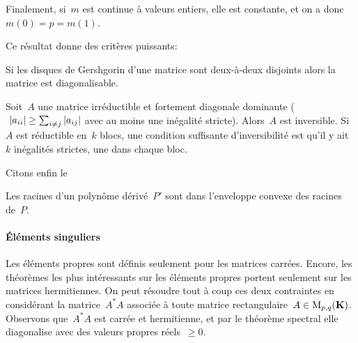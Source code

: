 \begin{exercice}
\begin{enumerate}
{		Finalement, si~$m$ est continue à valeurs entiers, elle est constante, et
		on a donc~$m(0)=p=m(1)$.
	}
\end{enumerate}
\end{exercice}

Ce résultat donne des critères puissants:

\begin{corollary}
	Si les disques de Gershgorin d'une matrice sont deux-à-deux disjoints alors
	la matrice est diagonalisable.
\end{corollary}

\begin{proposition}
	Soit~$A$ une matrice irréductible et fortement diagonale dominante
	($\ \left|a_{ii}\right|\ge\sum_{i\neq j}\left|a_{ij}\right|$ avec au moins une inégalité
	stricte).  Alors~$A$ est inversible.  Si~$A$ est réductible en~$k$ blocs,
	une condition suffisante d'inversibilité est qu'il y ait~$k$ inégalités
	strictes, une dans chaque bloc.
\end{proposition}

Citons enfin le
\begin{exercice}
	Les racines d'un polynôme dérivé~$P'$ sont dans l'enveloppe convexe des
	racines de~$P$.
\end{exercice}

\paragraph{Éléments singuliers}
Les éléments propres sont définis seulement pour les matrices carrées.
Encore, les théorèmes les plus intéressants sur les éléments propres portent
seulement sur les matrices hermitiennes.  On peut résoudre tout à coup ces
deux contraintes en considérant la matrice~$A^*A$ associée à toute matrice
rectangulaire~$A\in\mathrm{M}_{p,q}(\mathbf{K})$.  Observons que~$A^*A$ est carrée et
hermitienne, et par le théorème spectral elle diagonalise avec des valeurs
propres réels~$\ge 0$.

